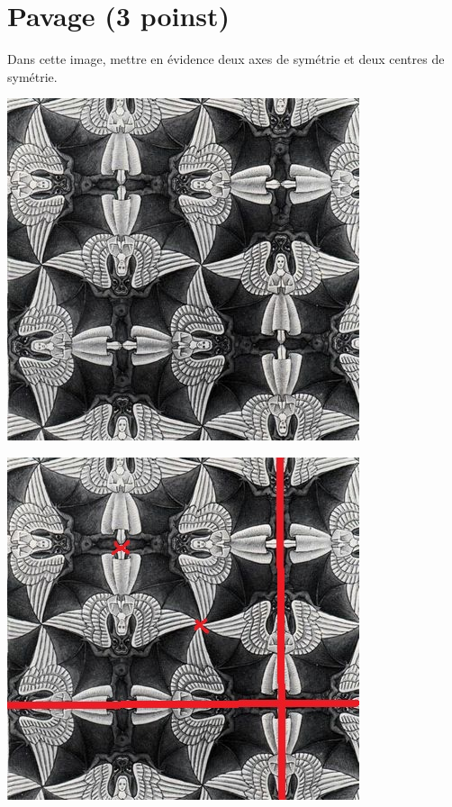 \section{Pavage (3 poinst)}

\begin{questions}
	\question[3] Dans cette image, mettre en évidence deux axes de symétrie et deux centres de symétrie.
	
	\begin{center}
		\includegraphics[scale=0.5]{img/anges}
	\end{center}

	\begin{solution}
		\begin{center}
			\includegraphics[scale=0.20]{img/anges_corr}
		\end{center}
	\end{solution}
\end{questions}


